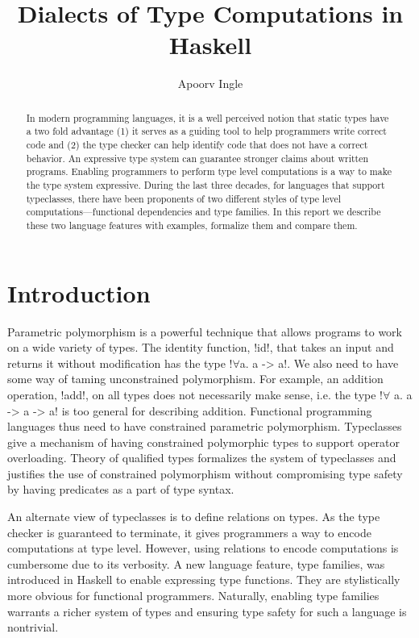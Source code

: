 \documentclass[format=acmsmall,manuscript,review,screen,nonacm,margin=1in,11pt]{acmart}
\title{Dialects of Type Computations in Haskell}
\author{Apoorv Ingle}
\affiliation{%
  \institution{University of Iowa}
  \department{Department of Computer Science}
  \streetaddress{McLean Hall}
  \city{Iowa City}
  \state{Iowa}
  \country{USA}}
\begin{document}
\begin{abstract}
In modern programming languages, it is a well perceived notion
that static types have a two fold advantage (1) it serves as a guiding tool to help programmers
write correct code and (2) the type checker can help identify
code that does not have a correct behavior. An expressive type system
can guarantee stronger claims about written programs. Enabling programmers to perform
type level computations is a way to make the type system expressive.
During the last three decades, for languages that support typeclasses, there have been proponents
of two different styles of type level computations---functional dependencies and type families.
In this report we describe these two language features with examples, formalize them and compare them.
\end{abstract}
\maketitle
\vspace{-1.25em}
\section{Introduction}
Parametric polymorphism is a powerful technique that allows programs to work on
a wide variety of types. The identity function, !id!, that takes an input and returns it
without modification has the type !$\forall$a. a -> a!.
We also need to have some way of taming unconstrained polymorphism.
For example, an addition operation, !add!, on all types does not necessarily make sense,
i.e. the type !$\forall$ a. a -> a -> a! is too general for describing addition.
Functional programming languages thus need to have constrained parametric polymorphism.
Typeclasses\cite{wadler_polymorphism_1989} give a mechanism
of having constrained polymorphic types to support operator overloading.
Theory of qualified types\cite{jones_qualified_1994} formalizes the
system of typeclasses and justifies the use of constrained polymorphism
without compromising type safety by having predicates as a part of type syntax.

An alternate view of typeclasses is to define relations on types. As the
type checker is guaranteed to terminate, it gives programmers a way to
encode computations at type level.
However, using relations to encode computations is cumbersome due to its verbosity.
A new language feature, type families\cite{schrijvers_towards_2007}, was introduced in Haskell
to enable expressing type functions. They are stylistically
more obvious for functional programmers. Naturally, enabling type families warrants
a richer system of types and ensuring type safety for such a language is nontrivial.
\end{document}

